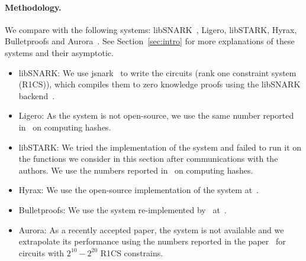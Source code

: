 \paragraph{Methodology.} We compare with the following systems: \textsf{libSNARK}~\cite{libsnark}, \textsf{Ligero}\cite{ligero}, \textsf{libSTARK}\cite{libstark}, \textsf{Hyrax}\cite{hyrax},  \textsf{Bulletproofs}\cite{bulletproofs} and \textsf{Aurora}~\cite{aurora}. See Section~\ref{sec:intro} for more explanations of these systems and their asymptotic. 
\begin{itemize}[leftmargin=*]
\item \textsf{libSNARK:} We use jsnark~\cite{jsnark} to write the circuits (rank one constraint system (R1CS)), which compiles them to zero knowledge proofs using the libSNARK backend~\cite{libsnark_impl}. 

\item\textsf{Ligero:} As the system is not open-source, we use the same number reported in~\cite{ligero} on computing hashes.

\item\textsf{libSTARK:} We tried the implementation of the system and failed to run it on the functions we consider in this section after communications with the authors. We use the numbers reported in~\cite{libstark} on computing hashes. 

\item\textsf{Hyrax:} We use the open-source implementation of the system at~\cite{hyrax_impl}.

\item\textsf{Bulletproofs:} We use the system re-implemented by~\cite{hyrax} at~\cite{hyrax_impl}.


\item\textsf{Aurora:} As a recently accepted paper, the system is not available and we extrapolate its performance using the numbers reported in the paper~\cite{aurora} for circuits with $2^{10}-2^{20}$ R1CS constrains.

\end{itemize}


